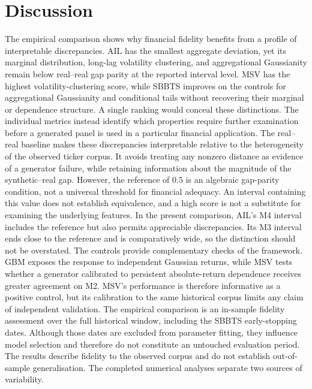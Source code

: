 \section{Discussion}\label{sec:discussion}

{\color{red}
The empirical comparison shows why financial fidelity benefits from
a profile of interpretable discrepancies.
AIL has the smallest aggregate deviation, yet its marginal distribution,
long-lag volatility clustering, and aggregational Gaussianity remain
below real--real gap parity at the reported interval level.
MSV has the highest volatility-clustering score, while SBBTS improves
on the controls for aggregational Gaussianity and conditional tails
without recovering their marginal or dependence structure.
A single ranking would conceal these distinctions.
The individual metrics instead identify which properties require
further examination before a generated panel is used in a particular
financial application.
The real--real baseline makes these discrepancies interpretable
relative to the heterogeneity of the observed ticker corpus.
It avoids treating any nonzero distance as evidence of a generator
failure, while retaining information about the magnitude of the
synthetic--real gap.
However, the reference of $0.5$ is an algebraic gap-parity condition,
not a universal threshold for financial adequacy.
An interval containing this value does not establish equivalence,
and a high score is not a substitute for examining the underlying
features.
In the present comparison, AIL's M4 interval includes the reference
but also permits appreciable discrepancies.
Its M3 interval ends close to the reference and is comparatively wide,
so the distinction should not be overstated.
The controls provide complementary checks of the framework.
GBM exposes the response to independent Gaussian returns, while MSV
tests whether a generator calibrated to persistent absolute-return
dependence receives greater agreement on M2.
MSV's performance is therefore informative as a positive control,
but its calibration to the same historical corpus limits any claim
of independent validation.
The empirical comparison is an in-sample fidelity assessment over the
full historical window, including the SBBTS early-stopping dates.
Although those dates are excluded from parameter fitting, they influence
model selection and therefore do not constitute an untouched evaluation
period.
The results describe fidelity to the observed corpus and do not
establish out-of-sample generalisation.
The completed numerical analyses separate two sources of variability.
}
